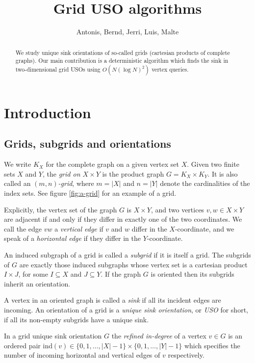 \documentclass[a4paper,10pt]{article}
\title{Grid USO algorithms}
\author{Antonis, Bernd, Jerri, Luis, Malte}
\newcommand{\indegree}{refined in-degree\xspace}
\newcommand{\ind}{\ensuremath{\mathrm{ind}}}
\begin{document}
\maketitle 

\begin{abstract}
    \noindent
    We study unique sink orientations of so-called grids
    (cartesian products of complete graphs).
    Our main contribution is a deterministic algorithm which finds the sink in
    two-dimensional grid USOs using $O(N (\log N)^2)$ vertex queries.
\end{abstract}

\section{Introduction}

\subsection{Grids, subgrids and orientations}

We write $K_X$ for the complete graph on a given vertex set $X$.
Given two finite sets $X$ and $Y$,
the \emph{grid on $X \times Y$} is the product graph $G = K_X \times K_Y$.
It is also called an \emph{$(m,n)$-grid}, where $m = |X|$ and $n = |Y|$ denote
the cardinalities of the index sets.
See figure \ref{fig:a-grid} for an example of a grid.

Explicitly, the vertex set of the graph $G$ is $X \times Y$, and two
vertices $v,w \in X \times Y$ are adjacent if and only if they differ in
exactly one of the two coordinates.
We call the edge $vw$ a \emph{vertical edge} if $v$ and $w$ differ in the
$X$-coordinate, and we speak of a \emph{horizontal edge} if they differ in the
$Y$-coordinate.

An induced subgraph of a grid is called a \emph{subgrid} if it is itself a grid.
The subgrids of $G$ are exactly those induced subgraphs whose vertex set is a
cartesian product $I \times J$, for some $I \subseteq X$ and $J \subseteq Y$.
If the graph $G$ is oriented then its subgrids inherit an orientation.

A vertex in an oriented graph is called a \emph{sink} if all its incident edges are incoming.
An orientation of a grid is a \emph{unique sink orientation}, or \emph{USO}
for short, if all its non-empty subgrids have a unique sink.

In a grid unique sink orientation $G$ the \emph{\indegree} of a vertex $v \in G$ is an ordered pair $\ind (v) \in \{0,1,\ldots,|X|-1\}\times \{0,1,\ldots,|Y|-1\}$ which specifies the number of incoming horizontal and vertical edges of $v$ respectively. 
\end{document}
